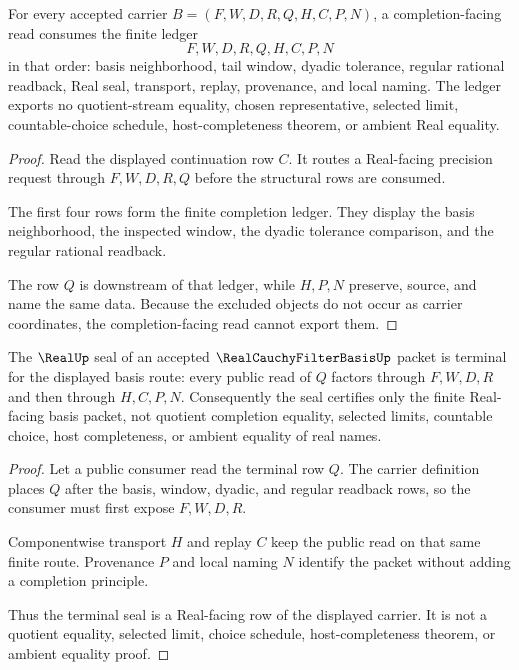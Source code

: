 \begin{theorem}
\label{thm:real-cauchy-filter-basis-completion-ledger}
For every accepted carrier $B=(F,W,D,R,Q,H,C,P,N)$, a completion-facing read consumes the finite ledger
$$
F,W,D,R,Q,H,C,P,N
$$
in that order: basis neighborhood, tail window, dyadic tolerance, regular rational readback, Real seal, transport, replay, provenance, and local naming. The ledger exports no quotient-stream equality, chosen representative, selected limit, countable-choice schedule, host-completeness theorem, or ambient Real equality.
\end{theorem}
\begin{proof}
Read the displayed continuation row $C$. It routes a Real-facing precision request through $F,W,D,R,Q$ before the structural rows are consumed.

The first four rows form the finite completion ledger. They display the basis neighborhood, the inspected window, the dyadic tolerance comparison, and the regular rational readback.

The row $Q$ is downstream of that ledger, while $H,P,N$ preserve, source, and name the same data. Because the excluded objects do not occur as carrier coordinates, the completion-facing read cannot export them.
\end{proof}

\begin{theorem}
\label{thm:real-cauchy-filter-basis-real-seal}
The $\RealUp$ seal of an accepted $\RealCauchyFilterBasisUp$ packet is terminal for the displayed basis route: every public read of $Q$ factors through $F,W,D,R$ and then through $H,C,P,N$. Consequently the seal certifies only the finite Real-facing basis packet, not quotient completion equality, selected limits, countable choice, host completeness, or ambient equality of real names.
\end{theorem}
\begin{proof}
Let a public consumer read the terminal row $Q$. The carrier definition places $Q$ after the basis, window, dyadic, and regular readback rows, so the consumer must first expose $F,W,D,R$.

Componentwise transport $H$ and replay $C$ keep the public read on that same finite route. Provenance $P$ and local naming $N$ identify the packet without adding a completion principle.

Thus the terminal seal is a Real-facing row of the displayed carrier. It is not a quotient equality, selected limit, choice schedule, host-completeness theorem, or ambient equality proof.
\end{proof}

